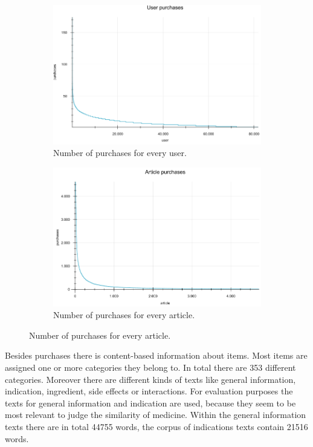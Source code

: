 \documentclass[10pt]{reportMaster}
\begin{document}
\begin{figure}
	\label{fig:purchases}
	\begin{subfigure}[c]{1\textwidth}
		\caption{Number of purchases for every user.}
		\centering
		\includegraphics[width=1\textwidth]{figures/experiments/userPurchases}
	\end{subfigure}
	\begin{subfigure}[c]{1\textwidth}
		\caption{Number of purchases for every article.}
		\centering
		\includegraphics[width=1\textwidth]{figures/experiments/articlePurchases}
	\end{subfigure}
\end{figure}

Besides purchases there is content-based information about items.
Most items are assigned one or more categories they belong to.
In total there are 353 different categories.
Moreover there are different kinds of texts like general information, indication, ingredient, side effects or interactions.
For evaluation purposes the texts for general information and indication are used, because they seem to be most relevant to judge the similarity of medicine.
Within the general information texts there are in total 44755 words, the corpus of indications texts contain 21516 words. %
\end{document}
